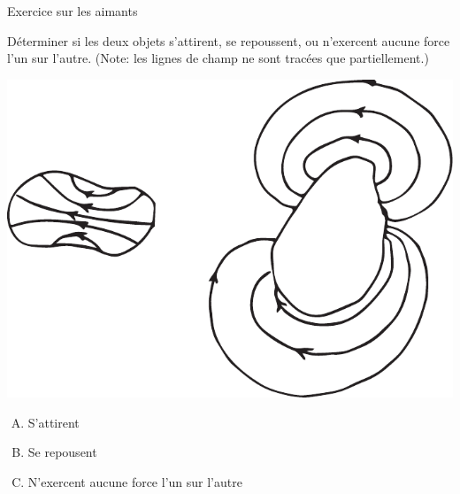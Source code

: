 \documentclass{beamer}
\begin{document}
\begin{frame}[t]{Exercice sur les aimants}
  
  Déterminer si les deux objets s'attirent, se repoussent, ou n'exercent aucune
  force l'un sur l'autre. (Note: les lignes de champ ne sont tracées que
  partiellement.)

  \begin{center}
    \includegraphics[scale=0.6]{figures/exercice-champ-magnetique1c.pdf}
  \end{center}

  \begin{enumerate}[A.]
    \item S'attirent
    \item Se repousent
    \item N'exercent aucune force l'un sur l'autre
  \end{enumerate}

\end{frame}
\end{document}
